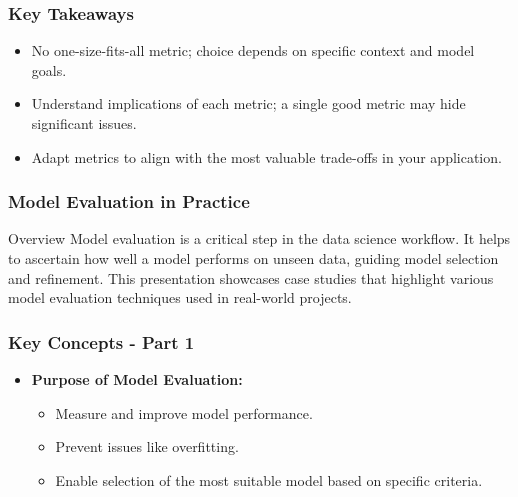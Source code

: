 \documentclass[aspectratio=169]{beamer}
\begin{document}
\begin{frame}[fragile]
    \frametitle{Key Takeaways}
    \begin{itemize}
        \item No one-size-fits-all metric; choice depends on specific context and model goals.
        \item Understand implications of each metric; a single good metric may hide significant issues.
        \item Adapt metrics to align with the most valuable trade-offs in your application.
    \end{itemize}
\end{frame}

\begin{frame}[fragile]
    \frametitle{Model Evaluation in Practice}
    \begin{block}{Overview}
        Model evaluation is a critical step in the data science workflow. It helps to ascertain how well a model performs on unseen data, guiding model selection and refinement. This presentation showcases case studies that highlight various model evaluation techniques used in real-world projects.
    \end{block}
\end{frame}

\begin{frame}[fragile]
    \frametitle{Key Concepts - Part 1}
    \begin{itemize}
        \item \textbf{Purpose of Model Evaluation:}
        \begin{itemize}
            \item Measure and improve model performance.
            \item Prevent issues like overfitting.
            \item Enable selection of the most suitable model based on specific criteria.
        \end{itemize}
    \end{itemize}
\end{frame}
\end{document}
